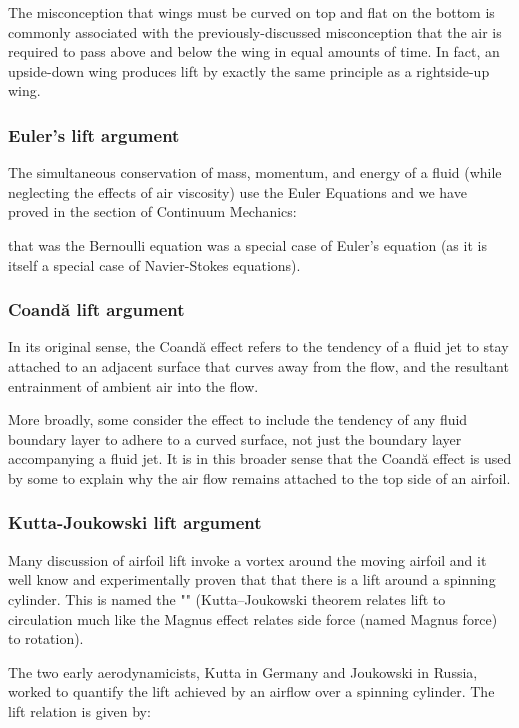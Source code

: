 	 \begin{tcolorbox}[title=Remark,colframe=black,arc=10pt]
	The misconception that wings must be curved on top and flat on the bottom is commonly associated with the previously-discussed misconception that the air is required to pass above and below the wing in equal amounts of time. In fact, an upside-down wing produces lift by exactly the same principle as a rightside-up wing.
	\end{tcolorbox}
	

	\subsubsection{Euler's lift argument}
	The simultaneous conservation of mass, momentum, and energy of a fluid (while neglecting the effects of air viscosity) use the Euler Equations and we have proved in the section of Continuum Mechanics:
	
	that was the Bernoulli equation was a special case of Euler's equation (as it is itself a special case of Navier-Stokes equations).
	
	\subsubsection{Coandă lift argument}
	In its original sense, the Coandă effect refers to the tendency of a fluid jet to stay attached to an adjacent surface that curves away from the flow, and the resultant entrainment of ambient air into the flow.
	
	More broadly, some consider the effect to include the tendency of any fluid boundary layer to adhere to a curved surface, not just the boundary layer accompanying a fluid jet. It is in this broader sense that the Coandă effect is used by some to explain why the air flow remains attached to the top side of an airfoil.
	
	\subsubsection{Kutta-Joukowski lift argument}
	Many discussion of airfoil lift invoke a vortex around the moving airfoil and it well know and experimentally proven that that there is a lift around a spinning cylinder. This is named the "" (Kutta–Joukowski theorem relates lift to circulation much like the Magnus effect relates side force (named Magnus force) to rotation).
	
	The two early aerodynamicists, Kutta in Germany and Joukowski in Russia, worked to quantify the lift achieved by an airflow over a spinning cylinder. The lift relation is given by:
	
